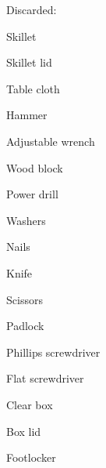 \documentclass{article}
\newcommand{\SubItem}[1]{
    {\setlength\itemindent{15pt} \item[-] #1}
}
\begin{document}
\begin{itemize}







    \item Discarded:
        \SubItem{Skillet}
        \SubItem{Skillet lid}
        \SubItem{Table cloth}
        \SubItem{Hammer}
        \SubItem{Adjustable wrench}
        \SubItem{Wood block}
        \SubItem{Power drill}
        \SubItem{Washers}
        \SubItem{Nails}
        \SubItem{Knife}
        \SubItem{Scissors}
        \SubItem{Padlock}
        \SubItem{Phillips screwdriver}
        \SubItem{Flat screwdriver}
        \SubItem{Clear box}
        \SubItem{Box lid}
        \SubItem{Footlocker}
\end{itemize}
\end{document}
